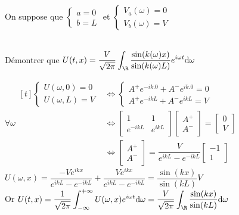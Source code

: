 \documentclass[12pt,a4paper]{article}
\begin{document}
\begin{exo}
	\begin{minipage}[t]{15cm}
		On suppose que $\begin{cases}
		a=0\\ b=L
	\end{cases}$ et $\begin{cases}
	V_a(\omega)=0\\ V_b(\omega) = V
	\end{cases}$
	\end{minipage}\\
	Démontrer que $U(t,x) = \dfrac V{\sqrt{2\pi}}\displaystyle\int_\R \dfrac{\sin(k(\omega)x)}{\sin(k(\omega)L)} e^{i\omega t}\mathrm d\omega$
\end{exo}	
\begin{sol}
	$\forall \omega \begin{aligned}[t]
		\begin{cases}
		U(\omega,0) = 0 \\
		U(\omega,L) = V
	\end{cases} &\iff \begin{cases}
	A^+e^{-ik.0}+A^-e^{ik.0} = 0 \\
	A^+e^{-ikL}+A^-e^{ikL} = V
	\end{cases}\\
	&\iff \begin{bmatrix}
		1 & 1\\
		e^{-ikL} & e^{ikL}
	\end{bmatrix}\begin{bmatrix}
	A^+\\ A^-
	\end{bmatrix} = \begin{bmatrix}
	0 \\ V
	\end{bmatrix}\\
	&\iff \begin{bmatrix}
		A^+ \\ A^-
	\end{bmatrix} = \dfrac V{e^{ikL}-e^{-ikL}}\begin{bmatrix}
	-1 \\ 1
	\end{bmatrix}
	\end{aligned}$\\
	
	$U(\omega,x) = \dfrac{-Ve^{ikx}}{e^{ikL}-e^{-ikL}} + \dfrac{Ve^{ikx}}{e^{ikL}-e^{-ikL}} = \dfrac{\sin(kx)}{\sin(kL)}V$\\
	Or $U(t,x) = \dfrac1{\sqrt{2\pi}}\displaystyle\int_{-\infty}^{+\infty} U(\omega,x) e^{i\omega t}\mathrm d\omega = \dfrac V{\sqrt{2\pi}}\displaystyle\int_\R \dfrac{\sin(kx)}{\sin(kL)}\mathrm d\omega$
\end{sol}
\end{document}
